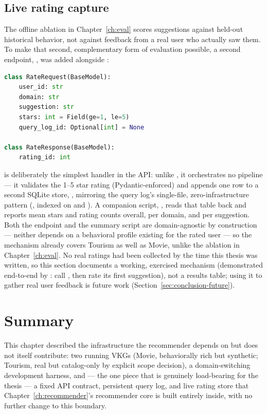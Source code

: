 \subsection{Live rating capture}
\label{sec:arch-ratings}

The offline ablation in Chapter~\ref{ch:eval} scores suggestions against held-out historical
behavior, not against feedback from a real user who actually saw them. To make that second,
complementary form of evaluation possible, a second endpoint, , was added
alongside :

\begin{lstlisting}[language=Python, caption={The rating contract. \code{query\_log\_id} is the id
returned by the \code{/recommend} call that produced the rated suggestion, so a rating can be
joined back to the request it responds to.}]
class RateRequest(BaseModel):
    user_id: str
    domain: str
    suggestion: str
    stars: int = Field(ge=1, le=5)
    query_log_id: Optional[int] = None

class RateResponse(BaseModel):
    rating_id: int
\end{lstlisting}

 is deliberately the simplest handler in the API: unlike
, it orchestrates no pipeline --- it validates the 1--5 star rating
(Pydantic-enforced) and appends one row to a second SQLite store, , mirroring the
query log's single-file, zero-infrastructure pattern (, indexed on 
and ). A companion script, , reads that table back
and reports mean stars and rating counts overall, per domain, and per suggestion. Both the endpoint
and the summary script are domain-agnostic by construction --- neither depends on a behavioral
profile existing for the rated user --- so the mechanism already covers Tourism as well as Movie,
unlike the ablation in Chapter~\ref{ch:eval}. No real ratings had been collected by the time this
thesis was written, so this section documents a working, exercised mechanism (demonstrated
end-to-end by : call , then rate its first suggestion),
not a results table; using it to gather real user feedback is future work
(Section~\ref{sec:conclusion-future}).

\section{Summary}

This chapter described the infrastructure the recommender depends on but does not itself
contribute: two running VKGs (Movie, behaviorally rich but synthetic; Tourism, real but
catalog-only by explicit scope decision), a domain-switching development harness, and --- the one
piece that is genuinely load-bearing for the thesis --- a fixed API contract, persistent query log,
and live rating store that Chapter~\ref{ch:recommender}'s recommender core is built entirely
inside, with no further change to this boundary.
